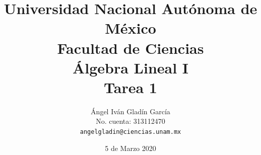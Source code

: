 \documentclass[11pt,letterpaper]{article}
\begin{document}
\title{
        Universidad Nacional Autónoma de México\\
        Facultad de Ciencias\\
        Álgebra Lineal I\\
    \vspace{.5cm}
    \large
        \textbf{Tarea 1}
}
\author{
    Ángel Iván Gladín García\\
    No. cuenta: 313112470\\
    \texttt{angelgladin@ciencias.unam.mx}
}
\date{5 de Marzo 2020}
\maketitle

\newtheorem{theorem}{Teorema}
\newtheorem{example}{Ejemplo}
\newtheorem{corollary}{Corolario}
\newtheorem{lemma}{Lemma}
\newtheorem{definition}{Definicion}
\newtheorem{prop}{Proposicion}
\end{document}
